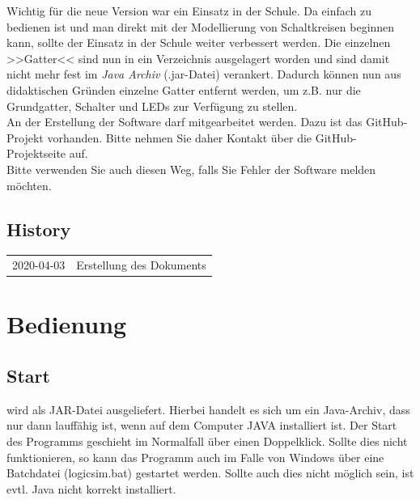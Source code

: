 \documentclass[12pt]{scrartcl}
\begin{document}
Wichtig für die neue Version war ein Einsatz in der Schule. Da \lsA{} einfach zu bedienen ist und man direkt mit der Modellierung von Schaltkreisen beginnen kann, sollte der Einsatz in der Schule weiter verbessert werden. Die einzelnen >>Gatter<< sind nun in ein Verzeichnis ausgelagert worden und sind damit nicht mehr fest im \textit{Java Archiv} (.jar-Datei) verankert. Dadurch können nun aus didaktischen Gründen einzelne Gatter entfernt werden, um z.B. nur die Grundgatter, Schalter und LEDs zur Verfügung zu stellen.\\

An der Erstellung der Software darf mitgearbeitet werden. Dazu ist das GitHub-Projekt vorhanden. Bitte nehmen Sie daher Kontakt über die GitHub-Projektseite auf.\\

Bitte verwenden Sie auch diesen Weg, falls Sie Fehler der Software melden möchten.\\

\subsection{History}
\begin{tabular}{p{4cm}p{10cm}}
2020-04-03 & Erstellung des Dokuments\\
\end{tabular}

\section{Bedienung}

\subsection{Start}
\lsN{} wird als JAR-Datei ausgeliefert. Hierbei handelt es sich um ein Java-Archiv, dass nur dann lauffähig ist, wenn auf dem Computer JAVA installiert ist. Der Start des Programms geschieht im Normalfall über einen Doppelklick. Sollte dies nicht funktionieren, so kann das Programm auch im Falle von Windows über eine Batchdatei (logicsim.bat) gestartet werden. Sollte auch dies nicht möglich sein, ist evtl. Java nicht korrekt installiert.
\end{document}
